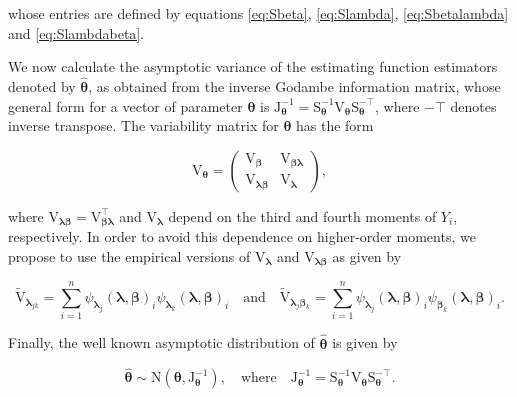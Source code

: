 \documentclass[9pt,a5paper,]{book}
\theoremstyle{definition}
\theoremstyle{definition}
\theoremstyle{remark}
\begin{document}
whose entries are defined by equations \eqref{eq:Sbeta}, \eqref{eq:Slambda},
\eqref{eq:Sbetalambda} and \eqref{eq:Slambdabeta}.

We now calculate the asymptotic variance of the estimating function
estimators denoted by \(\boldsymbol{\hat{\theta}}\), as obtained from
the inverse Godambe information matrix, whose general form for a vector
of parameter \(\boldsymbol{\theta}\) is
\(\mathrm{J}^{-1}_{\boldsymbol{\theta}} = \mathrm{S}^{-1}_{\boldsymbol{\theta}} \mathrm{V}_{\boldsymbol{\theta}} \mathrm{S}^{-\top}_{\boldsymbol{\theta}}\),
where \(-\top\) denotes inverse transpose. The variability matrix for
\(\boldsymbol{\theta}\) has the form

\begin{equation}
\mathrm{V}_{\boldsymbol{\theta}} = \begin{pmatrix}
\mathrm{V}_{\boldsymbol{\beta}} & \mathrm{V}_{\boldsymbol{\beta}\boldsymbol{\lambda}} \\
\mathrm{V}_{\boldsymbol{\lambda}\boldsymbol{\beta}} & \mathrm{V}_{\boldsymbol{\lambda}}
\end{pmatrix},
\label{eq:VTHETA}
\end{equation}

where
\(\mathrm{V}_{\boldsymbol{\lambda}\boldsymbol{\beta}} = \mathrm{V}^{\top}_{\boldsymbol{\beta}\boldsymbol{\lambda}}\)
and \(\mathrm{V}_{\boldsymbol{\lambda}}\) depend on the third and fourth
moments of \(Y_i\), respectively. In order to avoid this dependence on
higher-order moments, we propose to use the empirical versions of
\(\mathrm{V}_{\boldsymbol{\lambda}}\) and
\(\mathrm{V}_{\boldsymbol{\lambda}\boldsymbol{\beta}}\) as given by

\begin{equation*}
\tilde{\mathrm{V}}_{\boldsymbol{\lambda}_{jk}} = \sum_{i=1}^n \psi_{\boldsymbol{\lambda}_j}(\boldsymbol{\lambda}, \boldsymbol{\beta})_i\psi_{\boldsymbol{\lambda}_k}(\boldsymbol{\lambda}, \boldsymbol{\beta})_i \quad \text{and} \quad \tilde{\mathrm{V}}_{\boldsymbol{\lambda}_j \boldsymbol{\beta}_k} = \sum_{i=1}^n \psi_{\boldsymbol{\lambda}_j}(\boldsymbol{\lambda}, \boldsymbol{\beta})_i \psi_{\boldsymbol{\beta}_k}(\boldsymbol{\lambda}, \boldsymbol{\beta})_i.
\end{equation*}

Finally, the well known asymptotic distribution of
\(\boldsymbol{\hat{\theta}}\) \citep{Jorgensen2004} is given by

\begin{equation*}
\boldsymbol{\hat{\theta}} \sim \mathrm{N}(\boldsymbol{\theta}, \mathrm{J}_{\boldsymbol{\theta}}^{-1}), \quad \text{where} \quad
\mathrm{J}^{-1}_{\boldsymbol{\theta}} = \mathrm{S}^{-1}_{\boldsymbol{\theta}} \mathrm{V}_{\boldsymbol{\theta}} \mathrm{S}^{-\top}_{\boldsymbol{\theta}}.
\end{equation*}
\end{document}
